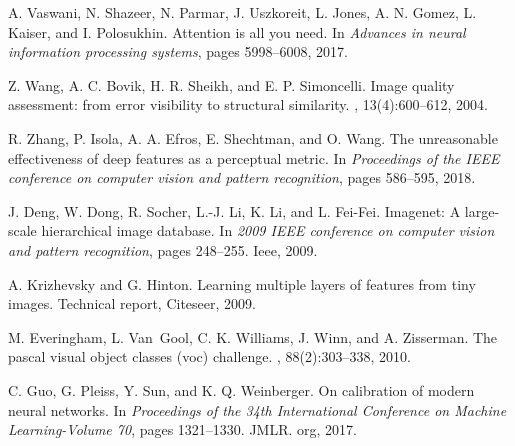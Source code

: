 \documentclass[12pt,a4paper]{article}
\begin{document}
\begin{thebibliography}{20}
A. Vaswani, N. Shazeer, N. Parmar, J. Uszkoreit, L. Jones, A. N. Gomez, L. Kaiser, and I. Polosukhin.
\newblock Attention is all you need.
\newblock In {\em Advances in neural information processing systems}, pages 5998--6008, 2017.

Z. Wang, A. C. Bovik, H. R. Sheikh, and E. P. Simoncelli.
\newblock Image quality assessment: from error visibility to structural similarity.
, 13(4):600--612, 2004.

R. Zhang, P. Isola, A. A. Efros, E. Shechtman, and O. Wang.
\newblock The unreasonable effectiveness of deep features as a perceptual metric.
\newblock In {\em Proceedings of the IEEE conference on computer vision and pattern recognition}, pages 586--595, 2018.

J. Deng, W. Dong, R. Socher, L.-J. Li, K. Li, and L. Fei-Fei.
\newblock Imagenet: A large-scale hierarchical image database.
\newblock In {\em 2009 IEEE conference on computer vision and pattern recognition}, pages 248--255. Ieee, 2009.

A. Krizhevsky and G. Hinton.
\newblock Learning multiple layers of features from tiny images.
\newblock Technical report, Citeseer, 2009.

M. Everingham, L. Van~Gool, C. K. Williams, J. Winn, and A. Zisserman.
\newblock The pascal visual object classes (voc) challenge.
, 88(2):303--338, 2010.

C. Guo, G. Pleiss, Y. Sun, and K. Q. Weinberger.
\newblock On calibration of modern neural networks.
\newblock In {\em Proceedings of the 34th International Conference on Machine Learning-Volume 70}, pages 1321--1330. JMLR. org, 2017.

\end{thebibliography}
\end{document}
